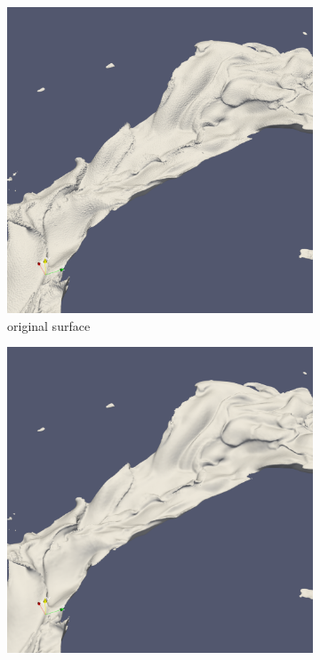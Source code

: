 \begin{figure}
	\begin{center}
		\begin{subfigure}[b]{0.47\textwidth}
			\includegraphics[width=\textwidth]{figures/CanionOriginal1.png}
			\caption{original surface}
		\end{subfigure}
		\begin{subfigure}[b]{0.47\textwidth}
			\includegraphics[width=\textwidth]{figures/CanionMls1.png}

\end{subfigure}
\end{center}
\end{figure}
